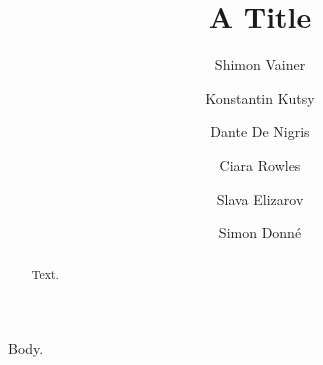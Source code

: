 \documentclass{llncs}
\begin{document}
\title{A Title}
\author{Shimon Vainer \and Konstantin Kutsy \and Dante De Nigris \and Ciara Rowles \and Slava Elizarov \and
Simon Donn\'e}
\maketitle
\begin{abstract}Text.\end{abstract}
Body.
\end{document}

